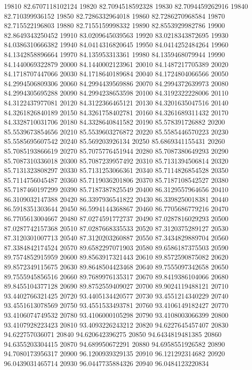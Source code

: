 {19810 82.6707118102124
19820 82.7094518592328
19830 82.7094459262916
19840 82.710399936152
19850 82.7286332964018
19860 82.7286270968584
19870 82.715522196803
19880 82.7155159998332
19890 82.8553929982786
19900 82.8649343250452
19910 83.0209645039563
19920 83.0218343872695
19930 84.0386310666382
19940 84.0414316820645
19950 84.0414252484264
19960 84.1342858896664
19970 84.135953313361
19980 84.1359468079944
19990 84.1440069322879
20000 84.1440002123961
20010 84.1487217705389
20020 84.1718707447066
20030 84.1718640189684
20040 84.1724804066566
20050 84.2994506809306
20060 84.2994439569886
20070 84.2994372639973
20080 84.2994305695288
20090 84.2994238653598
20100 84.3192322228006
20110 84.3122437977081
20120 84.3122366465121
20130 84.3201635047516
20140 84.3261826840189
20150 84.3261758402781
20160 84.3261689311432
20170 84.3328710031706
20180 84.3328640841582
20190 85.578391726882
20200 85.5539673854656
20210 85.5539603276872
20220 85.5585446570223
20230 85.5585695607542
20240 85.569203926134
20250 85.6869341155431
20260 85.7085193866619
20270 85.7075776451944
20280 85.7087380649293
20290 85.7087310336018
20300 85.7087239957492
20310 85.7131394506814
20320 85.7131323808297
20330 85.7131253066361
20340 85.7114826854528
20350 85.7114756045487
20360 85.7119036201806
20370 85.7187108542527
20380 85.7187460197299
20390 85.7187387825549
20400 86.3129557964656
20410 86.3109032147388
20420 86.3397936541822
20430 86.3398250018381
20440 86.5918351303644
20450 86.5994144368867
20460 86.7705686779216
20470 86.7705613004667
20480 87.0274591772737
20490 87.0287816029293
20500 87.0287742157368
20510 87.0287668335533
20520 87.3120375289127
20530 87.3120301007713
20540 87.3120203260887
20550 87.3434829889704
20560 87.3384842174524
20570 89.6582297071903
20580 89.6586187375503
20590 89.7574852915959
20600 89.8563917321443
20610 89.8572590875082
20620 89.8572349115675
20630 89.8648504423468
20640 89.7555097342658
20650 89.7555945856516
20660 89.7689976135317
20670 89.8419386104066
20680 89.8455104377128
20690 89.8752559409027
20700 89.9024119488121
20710 93.4402766321425
20720 93.4405134420577
20730 93.4551214340229
20740 93.4551613078569
20750 93.4551533493781
20760 93.4106149182427
20770 93.4106074749532
20780 93.4106000105298
20790 93.4108003066399
20800 93.4107928223423
20810 93.4093226243212
20820 94.6227645457407
20830 94.622757036071
20840 94.620642396275
20850 94.6434819481385
20860 94.6355203304415
20870 94.689950672291
20880 94.6958551926582
20890 94.7080173956317
20900 96.1200939329135
20910 96.121292314682
20920 96.0439031465714
20930 96.0447735884326
20940 96.0484123220834
}
